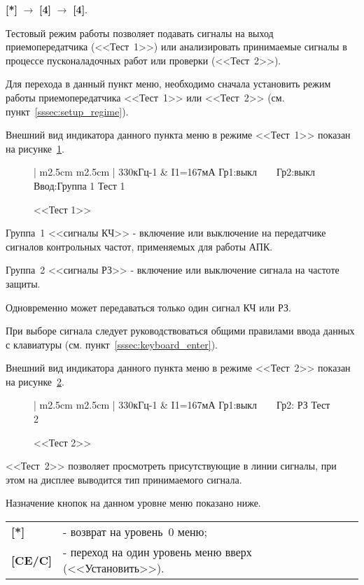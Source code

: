 \textbf{[*]} $\rightarrow$ \textbf{[4]} $\rightarrow$ \textbf{[4]}.

Тестовый режим работы позволяет подавать сигналы на выход приемопередатчика (<<Тест~1>>) или анализировать принимаемые сигналы в процессе пусконаладочных работ или проверки (<<Тест~2>>).

Для перехода в данный пункт меню, необходимо сначала установить режим работы приемопередатчика <<Тест~1>> или <<Тест~2>> (см. пункт~\ref{sssec:setup_regime}).

Внешний вид индикатора данного пункта меню в режиме <<Тест~1>> показан на рисунке~\ref{fig:setup_test_1}.
 
\begin{figure}[H]
	\centering
		
	\begin{tabular}{| m{2.5cm}  m{2.5cm} |}
		\firsthline
		330кГц-1	& \raggedleft I1=167мА			\tabularnewline 
		 {Гр1:выкл~~~~Гр2:выкл}	\tabularnewline
		 {Ввод:Группа 1} 		\tabularnewline 
		 {Тест 1}				\tabularnewline 
		\lasthline
	\end{tabular} 
	
	\caption{<<Тест 1>>}
	\label{fig:setup_test_1}
\end{figure}

Группа~1 <<сигналы КЧ>> - включение или выключение на передатчике сигналов контрольных частот, применяемых для работы АПК. 

Группа~2 <<сигналы РЗ>> - включение или выключение сигнала на частоте защиты. 

Одновременно может передаваться только один сигнал КЧ или РЗ.

При выборе сигнала следует руководствоваться общими правилами ввода данных с клавиатуры (см. пункт~\ref{sssec:keyboard_enter}).

Внешний вид индикатора данного пункта меню в режиме <<Тест~2>> показан на рисунке~\ref{fig:setup_test_2}.
 
\begin{figure}[H]
	\centering
	
	\begin{tabular}{| m{2.5cm}  m{2.5cm} |}
		\firsthline
		330кГц-1	& \raggedleft I1=167мА			\tabularnewline 
		 {Гр1:выкл~~~~Гр2: РЗ}	\tabularnewline
		 {} 					\tabularnewline 
		 {Тест 2}				\tabularnewline 
		\lasthline
	\end{tabular} 
	
	\caption{<<Тест 2>>}
	\label{fig:setup_test_2}
\end{figure}

<<Тест~2>> позволяет просмотреть присутствующие в линии сигналы, при этом на дисплее выводится тип принимаемого сигнала.

Назначение кнопок на данном уровне меню показано ниже.
\begin{center}
	\begin{tabular}{p{2cm} p{15cm}}
		\textbf{[*]} 			& - возврат на уровень~0 меню; \tabularnewline
		\textbf{[CE/C]} 		& - переход на один уровень меню вверх (<<Установить>>). \tabularnewline				
	\end{tabular}
\end{center} 
